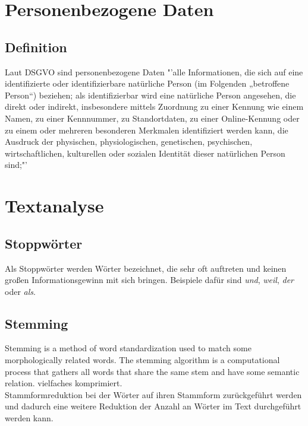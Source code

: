 \section{Personenbezogene Daten}
	\subsection{Definition}
	Laut DSGVO sind personenbezogene Daten "'alle Informationen, die sich auf eine identifizierte oder identifizierbare natürliche Person (im Folgenden „betroffene Person“) beziehen; als identifizierbar wird eine natürliche Person angesehen, die direkt oder indirekt, insbesondere mittels Zuordnung zu einer Kennung wie einem Namen, zu einer Kennnummer, zu Standortdaten, zu einer Online-Kennung oder zu einem oder mehreren besonderen Merkmalen identifiziert werden kann, die Ausdruck der physischen, physiologischen, genetischen, psychischen, wirtschaftlichen, kulturellen oder sozialen Identität dieser natürlichen Person sind;"'\cite{personenbezogeneDaten}
\section{Textanalyse}
	\subsection{Stoppwörter}
	Als Stoppwörter werden Wörter bezeichnet, die sehr oft auftreten und keinen großen Informationsgewinn mit sich bringen. Beispiele dafür sind \textit{und}, \textit{weil}, \textit{der} oder \textit{als}.\cite{Stopwords} \\
	\subsection{Stemming}
	Stemming is a method of  word standardization used to match some morphologically related words. The stemming algorithm is a computational  process that gathers all words that share the same stem and have some semantic relation. \cite{eldesouki2009stemming}
	vielfaches komprimiert.\\
	Stammformreduktion bei der Wörter auf ihren Stammform zurückgeführt werden und dadurch eine weitere Reduktion der Anzahl an Wörter im Text durchgeführt werden kann.

